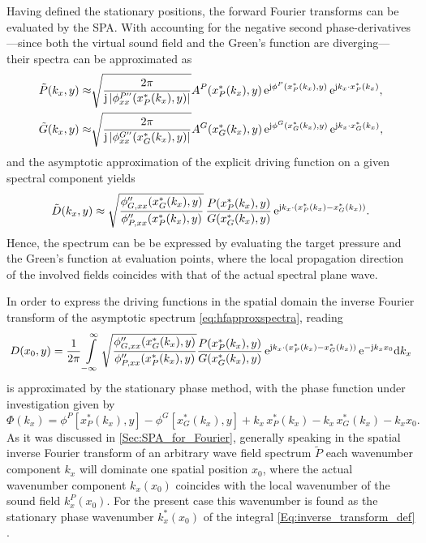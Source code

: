 Having defined the stationary positions, the forward Fourier transforms can be evaluated by the SPA. 
With accounting for the negative second phase-derivatives---since both the virtual sound field and the Green's function are diverging--- their spectra can be approximated as \cite[Ch. 5]{Tracy2014}
\begin{align}
\tilde{P}(k_x,y) \approx& \sqrt{\frac{2\pi}{\mathrm{j} \, |\phi^{P''}_{xx}(x^*_P(k_x),y)|}} A^P(x^*_P(k_x),y) \, \mathrm{e}^{\mathrm{j} \phi^P(x^*_P(k_x),y)} \, \mathrm{e}^{\mathrm{j} k_x \cdot x^*_P(k_x)},\\
\tilde{G}(k_x,y) \approx& \sqrt{\frac{2\pi}{\mathrm{j} \, |\phi^{G''}_{xx}(x^*_G(k_x),y)|}} A^G(x^*_G(k_x),y) \, \mathrm{e}^{\mathrm{j} \phi^G(x^*_G(k_x),y)} \, \mathrm{e}^{\mathrm{j} k_x \cdot x^*_G(k_x)},
\end{align}
and the asymptotic approximation of the explicit driving function on a given spectral component yields
\begin{equation}
\label{eq:hfapproxspectra}
\tilde{D}(k_x,y)
\approx  
\sqrt{\frac{\phi_{G,xx}''(x^*_G(k_x),y)}{\phi_{P,xx}''(x^*_P(k_x),y)}}
\, \frac{P(x^*_P(k_x),y)}{G(x^*_G(k_x),y)}
\, \mathrm{e}^{\mathrm{j} k_x \cdot \left( x^*_P(k_x) - x^*_G(k_x)\right)}.
\end{equation}
Hence, the spectrum can be be expressed by evaluating the target pressure and the Green's function at evaluation points, where the local propagation direction of the involved fields coincides with that of the actual spectral plane wave.

In order to express the driving functions in the spatial domain the inverse Fourier transform of the asymptotic spectrum \eqref{eq:hfapproxspectra}, reading
%
\begin{equation}
\label{Eq:inverse_transform_def}
D(x_0,y)
=  \frac{1}{2\pi} \int\limits_{-\infty}^{\infty}
\sqrt{\frac{\phi_{G,xx}''(x^*_G(k_x),y)}{\phi_{P,xx}''(x^*_P(k_x),y)}} 
\frac{P(x^*_P(k_x),y)}{G(x^*_G(k_x),y)}
\,\mathrm{e}^{\mathrm{j} k_x \cdot\left( x^*_P(k_x) - x^*_G(k_x)\right)}
\,\mathrm{e}^{-\mathrm{j} k_x x_0} \mathrm{d} k_x
\end{equation}
is approximated by the stationary phase method, with the phase function under investigation given by
\begin{equation}
\label{Eq:inverse_transform_phase_function}
{\Phi}(k_x) = \phi^P[x^*_P(k_x),y] -  \phi^G[x^*_G(k_x),y] +  k_x \, x^*_P(k_x) - k_x\, x^*_G(k_x) -  k_x x_0.
\end{equation}
%
As it was discussed in \ref{Sec:SPA_for_Fourier}, generally speaking in the spatial inverse Fourier transform of an arbitrary wave field spectrum $\tilde{P}$ each wavenumber component $k_x$ will dominate one spatial position $x_0$, where the actual wavenumber component $k_x(x_0)$ coincides with the local wavenumber of the sound field $k_x^P(x_0)$.
For the present case this wavenumber is found as the stationary phase wavenumber $k_x^*(x_0)$ of the integral \eqref{Eq:inverse_transform_def} \cite{Tracy2014}.

